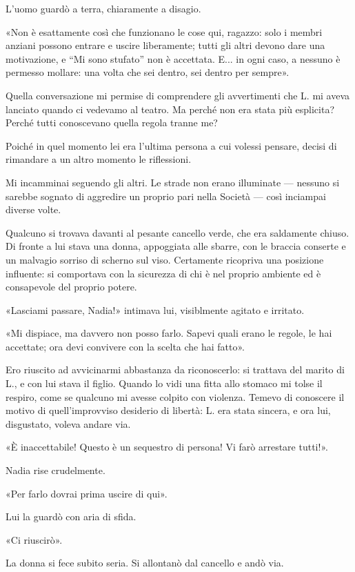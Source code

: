 \documentclass[a4paper,11pt,oneside,openright,final]{memoir}
\begin{document}
L'uomo guardò a terra, chiaramente a disagio.

«Non è esattamente così che funzionano le cose qui, ragazzo: solo i membri
anziani possono entrare e uscire liberamente; tutti gli altri devono dare una
motivazione, e ``Mi sono stufato'' non è accettata. E... in ogni caso, a nessuno
è permesso mollare: una volta che sei dentro, sei dentro per sempre».

Quella conversazione mi permise di comprendere gli avvertimenti che L. mi aveva
lanciato quando ci vedevamo al teatro. Ma perché non era stata più esplicita?
Perché tutti conoscevano quella regola tranne me?

Poiché in quel momento lei era l'ultima persona a cui volessi pensare, decisi di
rimandare a un altro momento le riflessioni.

Mi incamminai seguendo gli altri. Le strade non erano illuminate --- nessuno si
sarebbe sognato di aggredire un proprio pari nella Società --- così inciampai
diverse volte.

Qualcuno si trovava davanti al pesante cancello verde, che era saldamente
chiuso. Di fronte a lui stava una donna, appoggiata alle sbarre, con le braccia
conserte e un malvagio sorriso di scherno sul viso. Certamente ricopriva una
posizione influente: si comportava con la sicurezza di chi è nel proprio
ambiente ed è consapevole del proprio potere.

«Lasciami passare, Nadia!» intimava lui, visiblmente agitato e irritato.

«Mi dispiace, ma davvero non posso farlo. Sapevi quali erano le regole, le hai
accettate; ora devi convivere con la scelta che hai fatto».

Ero riuscito ad avvicinarmi abbastanza da riconoscerlo: si trattava del marito
di L., e con lui stava il figlio. Quando lo vidi una fitta allo stomaco mi
tolse il respiro, come se qualcuno mi avesse colpito con violenza. Temevo di
conoscere il motivo di quell'improvviso desiderio di libertà: L. era stata
sincera, e ora lui, disgustato, voleva andare via.

«È inaccettabile! Questo è un sequestro di persona! Vi farò arrestare tutti!».

Nadia rise crudelmente.

«Per farlo dovrai prima uscire di qui».

Lui la guardò con aria di sfida.

«Ci riuscirò».

La donna si fece subito seria. Si allontanò dal cancello e andò via.
\end{document}
